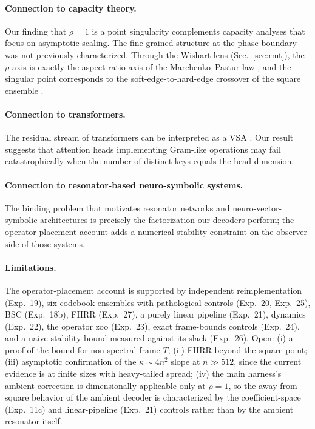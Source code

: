 \documentclass[11pt,a4paper]{article}
\begin{document}
\paragraph{Connection to capacity theory.} Our finding that $\rho = 1$ is a point singularity complements capacity analyses \citep{thomas2023capacity} that focus on asymptotic scaling. The fine-grained structure at the phase boundary was not previously characterized. Through the Wishart lens (Sec.~\ref{sec:rmt}), the $\rho$ axis is exactly the aspect-ratio axis of the Marchenko--Pastur law \citep{marchenko1967distribution}, and the singular point corresponds to the soft-edge-to-hard-edge crossover of the square ensemble \citep{tracy1994level, edelman1988eigenvalues}.

\paragraph{Connection to transformers.} The residual stream of transformers can be interpreted as a VSA \citep{dhayalkar2025binding, schlegel2022comparison}. Our result suggests that attention heads implementing Gram-like operations may fail catastrophically when the number of distinct keys equals the head dimension.

\paragraph{Connection to resonator-based neuro-symbolic systems.} The binding problem that motivates resonator networks and neuro-vector-symbolic architectures \citep{frady2020resonator, hersche2023neuro} is precisely the factorization our decoders perform; the operator-placement account adds a numerical-stability constraint on the observer side of those systems.

\paragraph{Limitations.} The operator-placement account is supported by independent reimplementation (Exp.~19), six codebook ensembles with pathological controls (Exp.~20, Exp.~25), BSC (Exp.~18b), FHRR (Exp.~27), a purely linear pipeline (Exp.~21), dynamics (Exp.~22), the operator zoo (Exp.~23), exact frame-bounds controls (Exp.~24), and a naive stability bound measured against its slack (Exp.~26). Open: (i) a proof of the bound for non-spectral-frame $T$; (ii) FHRR beyond the square point; (iii) asymptotic confirmation of the $\kappa \sim 4n^{2}$ slope at $n \gg 512$, since the current evidence is at finite sizes with heavy-tailed spread; (iv) the main harness's ambient correction is dimensionally applicable only at $\rho=1$, so the away-from-square behavior of the ambient decoder is characterized by the coefficient-space (Exp.~11c) and linear-pipeline (Exp.~21) controls rather than by the ambient resonator itself.
\end{document}

